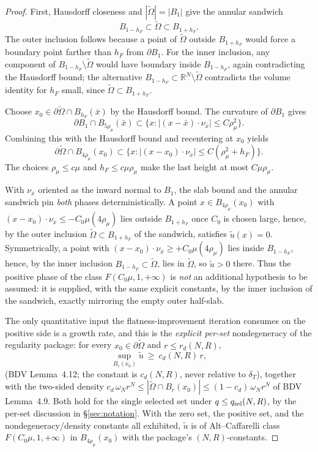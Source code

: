 \documentclass[11pt]{article}
\theoremstyle{definition}
\newcommand{\R}{\mathbb{R}}
\newcommand{\abs}[1]{\left|#1\right|}
\begin{document}
\begin{proof}
First, Hausdorff closeness and $\abs{\widetilde\Omega}=\abs{B_1}$ give the
annular sandwich
\[
B_{1-h_F}\subset\widetilde\Omega\subset B_{1+h_F}.
\]
The outer inclusion follows because a point of $\widetilde\Omega$ outside
$B_{1+h_F}$ would force a boundary point farther than $h_F$ from $\partial B_1$.
For the inner inclusion, any component of
$B_{1-h_F}\setminus\widetilde\Omega$ would have boundary inside $B_{1-h_F}$,
again contradicting the Hausdorff bound; the alternative
$B_{1-h_F}\subset\R^N\setminus\widetilde\Omega$ contradicts the volume identity
for $h_F$ small, since $\widetilde\Omega\subset B_{1+h_F}$.

Choose $x_0\in\partial\widetilde\Omega\cap B_{h_F}(\bar x)$ by the
Hausdorff bound. The curvature of $\partial B_1$ gives
\[
\partial B_1\cap B_{5\rho_\mu}(\bar x)\subset
\{x:\abs{(x-\bar x)\cdot\nu_{\bar x}}\le C\rho_\mu^2\}.
\]
Combining this with the Hausdorff bound and recentering at $x_0$ yields
\[
\partial\widetilde\Omega\cap B_{4\rho_\mu}(x_0)
\subset
\{x:\abs{(x-x_0)\cdot\nu_{\bar x}}\le C(\rho_\mu^2+h_F)\}.
\]
The choices $\rho_\mu\le c\mu$ and $h_F\le c\mu\rho_\mu$ make the last height
at most $C\mu\rho_\mu$.

With $\nu_{\bar x}$ oriented as the inward normal to $B_1$, the slab bound and
the annular sandwich pin \emph{both} phases deterministically. A point
$x\in B_{4\rho_\mu}(x_0)$ with
$(x-x_0)\cdot\nu_{\bar x}\le -C_0\mu(4\rho_\mu)$ lies outside $B_{1+h_F}$ once
$C_0$ is chosen large, hence, by the outer inclusion
$\widetilde\Omega\subset B_{1+h_F}$ of the sandwich, satisfies
$\widetilde u(x)=0$. Symmetrically, a point with
$(x-x_0)\cdot\nu_{\bar x}\ge +C_0\mu(4\rho_\mu)$ lies inside $B_{1-h_F}$, hence,
by the inner inclusion $B_{1-h_F}\subset\widetilde\Omega$, lies in
$\widetilde\Omega$, so $\widetilde u>0$ there. Thus the positive phase of the
class $F(C_0\mu,1,+\infty)$ is \emph{not} an additional hypothesis to be
assumed: it is supplied, with the same explicit constants, by the inner
inclusion of the sandwich, exactly mirroring the empty outer half-slab.

The only quantitative input the flatness-improvement iteration consumes on the
positive side is a growth rate, and this is the \emph{explicit per-set}
nondegeneracy of the regularity package: for every $x_0\in\partial\widetilde
\Omega$ and $r\le r_d(N,R)$,
\[
\sup_{B_r(x_0)}\widetilde u\ \ge\ c_d(N,R)\,r ,
\]
(BDV Lemma~4.12; the constant is $c_d(N,R)$, never relative to $\delta_T$),
together with the two-sided density $c_d\,\omega_N r^{N}\le
\abs{\widetilde\Omega\cap B_r(x_0)}\le(1-c_d)\,\omega_N r^{N}$ of BDV
Lemma~4.9. Both hold for the single selected set under
$q\le q_{\rm sel}(N,R)$, by the per-set discussion in
\S\ref{sec:notation}. With the zero set, the positive set, and the
nondegeneracy/density constants all exhibited, $\widetilde u$ is of
Alt--Caffarelli class $F(C_0\mu,1,+\infty)$ in $B_{4\rho_\mu}(x_0)$ with the
package's $(N,R)$-constants.
\end{proof}
\end{document}
